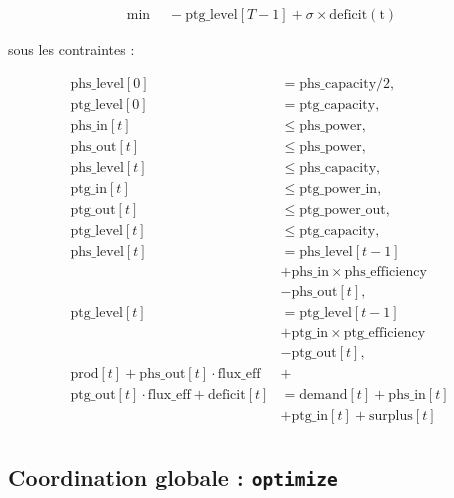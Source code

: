 \documentclass[12pt,a4paper]{article}
\begin{document}
\begin{tcolorbox}[colback=violet!5!white, colframe=blue!75!black, breakable]

\begin{align*}
\min \quad
- \mathrm{ptg\_level}[T-1]
+ \sigma \times \mathrm{deficit(t)}
\end{align*}

sous les contraintes :

\begin{align*}
\mathrm{phs\_level}[0] &=\mathrm{phs\_capacity}/2,\\
\mathrm{ptg\_level}[0] &= \mathrm{ptg\_capacity},\\[0.2cm]
\mathrm{phs\_in}[t] &\le \mathrm{phs\_power},\\
\mathrm{phs\_out}[t] &\le \mathrm{phs\_power},\\
\mathrm{phs\_level}[t] &\le \mathrm{phs\_capacity},\\
\mathrm{ptg\_in}[t] &\le \mathrm{ptg\_power\_in},\\
\mathrm{ptg\_out}[t] &\le \mathrm{ptg\_power\_out},\\
\mathrm{ptg\_level}[t] &\le \mathrm{ptg\_capacity},\\
\mathrm{phs\_level}[t] &= \mathrm{phs\_level}[t-1] \nonumber \\
&+ \mathrm{phs\_in}\times\mathrm{phs\_efficiency} \nonumber \\
& -\mathrm{phs\_out}[t],\\
\mathrm{ptg\_level}[t] &= \mathrm{ptg\_level}[t-1] \nonumber \\
&+ \mathrm{ptg\_in}\times\mathrm{ptg\_efficiency} \nonumber \\
& -\mathrm{ptg\_out}[t],\\
\mathrm{prod}[t]+\mathrm{phs\_out}[t]\cdot\mathrm{flux\_eff}&+\\
\mathrm{ptg\_out}[t]\cdot\mathrm{flux\_eff}+\mathrm{deficit}[t]&=\mathrm{demand}[t]+\mathrm{phs\_in}[t]\\
&+\mathrm{ptg\_in}[t]+\mathrm{surplus}[t]\\
\end{align*}
\end{tcolorbox}

\newpage

\subsection{Coordination globale : \texttt{optimize}}
\end{document}
